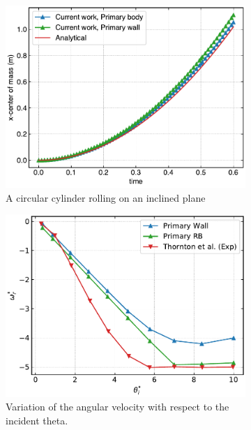 \begin{figure}[!htpb]
  \begin{subfigure}{0.48\textwidth}
    \centering
    \includegraphics[width=1.\textwidth]{figures/csph/figures/de_2021_cylinder_rolling_on_an_inclined_plane_primary_vs_secondary/mohseni_primary_body_xcom_vs_time}
    \caption{A circular cylinder rolling on an inclined plane}\label{fig:rps}
  \end{subfigure}
  \begin{subfigure}{0.48\textwidth}
    \centering
    \includegraphics[width=1.\textwidth]{figures/csph/figures/vyas_2021_rebound_kinematics_3d_compare_flipped/theta_vs_omega}
    \caption{Variation of the angular velocity with respect to the incident
      theta.}\label{fig:vps}
  \end{subfigure}
  \caption{}
\label{fig:primary-secondary-four-examples}
\end{figure}



